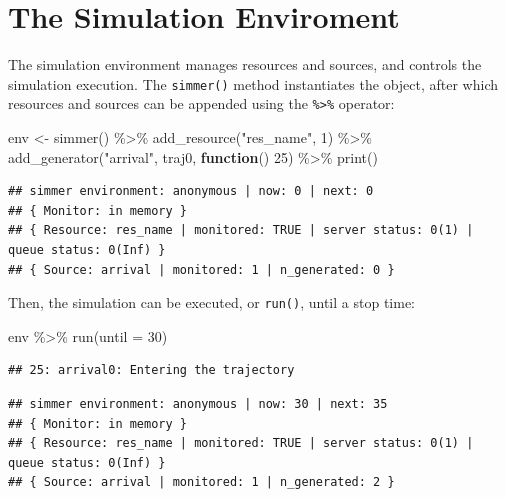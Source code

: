 \documentclass[
]{book}
\newenvironment{Shaded}{\begin{snugshade}}{\end{snugshade}}
\newcommand{\AttributeTok}[1]{\textcolor[rgb]{0.77,0.63,0.00}{#1}}
\newcommand{\ControlFlowTok}[1]{\textcolor[rgb]{0.13,0.29,0.53}{\textbf{#1}}}
\newcommand{\DecValTok}[1]{\textcolor[rgb]{0.00,0.00,0.81}{#1}}
\newcommand{\FunctionTok}[1]{\textcolor[rgb]{0.00,0.00,0.00}{#1}}
\newcommand{\NormalTok}[1]{#1}
\newcommand{\OtherTok}[1]{\textcolor[rgb]{0.56,0.35,0.01}{#1}}
\newcommand{\SpecialCharTok}[1]{\textcolor[rgb]{0.00,0.00,0.00}{#1}}
\newcommand{\StringTok}[1]{\textcolor[rgb]{0.31,0.60,0.02}{#1}}
\begin{document}
\hypertarget{the-simulation-enviroment}{%
\section{The Simulation Enviroment}\label{the-simulation-enviroment}}

The simulation environment manages resources and sources, and controls the simulation execution. The \texttt{simmer()} method instantiates the object, after which resources and sources can be appended using the \texttt{\%\textgreater{}\%} operator:

\begin{Shaded}
\begin{Highlighting}[]
\NormalTok{env }\OtherTok{\textless{}{-}} \FunctionTok{simmer}\NormalTok{() }\SpecialCharTok{\%\textgreater{}\%} 
  \FunctionTok{add\_resource}\NormalTok{(}\StringTok{"res\_name"}\NormalTok{, }\DecValTok{1}\NormalTok{) }\SpecialCharTok{\%\textgreater{}\%}
  \FunctionTok{add\_generator}\NormalTok{(}\StringTok{"arrival"}\NormalTok{, traj0, }\ControlFlowTok{function}\NormalTok{() }\DecValTok{25}\NormalTok{) }\SpecialCharTok{\%\textgreater{}\%}
  \FunctionTok{print}\NormalTok{()}
\end{Highlighting}
\end{Shaded}

\begin{verbatim}
## simmer environment: anonymous | now: 0 | next: 0
## { Monitor: in memory }
## { Resource: res_name | monitored: TRUE | server status: 0(1) | queue status: 0(Inf) }
## { Source: arrival | monitored: 1 | n_generated: 0 }
\end{verbatim}

Then, the simulation can be executed, or \texttt{run()}, until a stop time:

\begin{Shaded}
\begin{Highlighting}[]
\NormalTok{env }\SpecialCharTok{\%\textgreater{}\%} \FunctionTok{run}\NormalTok{(}\AttributeTok{until =} \DecValTok{30}\NormalTok{)}
\end{Highlighting}
\end{Shaded}

\begin{verbatim}
## 25: arrival0: Entering the trajectory
\end{verbatim}

\begin{verbatim}
## simmer environment: anonymous | now: 30 | next: 35
## { Monitor: in memory }
## { Resource: res_name | monitored: TRUE | server status: 0(1) | queue status: 0(Inf) }
## { Source: arrival | monitored: 1 | n_generated: 2 }
\end{verbatim}
\end{document}
